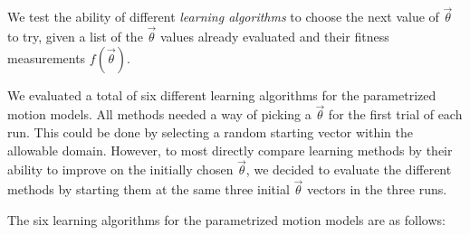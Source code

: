 We test the ability of different \emph{learning algorithms} to choose the next value of $\vec{\theta}$ to try, given a list of the
$\vec{\theta}$ values already evaluated and their fitness measurements $f(\vec{\theta})$.

We evaluated a total of six different
learning algorithms for the parametrized motion models.  All methods
needed a way of picking a $\vec{\theta}$ for the first trial of each run.  This could be done by selecting a random starting vector within the
allowable domain.  However, to most directly compare learning methods
by their ability to improve on the initially chosen $\vec{\theta}$, we
decided to evaluate the different methods by starting them at the same three
initial $\vec{\theta}$ vectors in the three runs. 


The six learning algorithms for the parametrized motion models are as follows:






